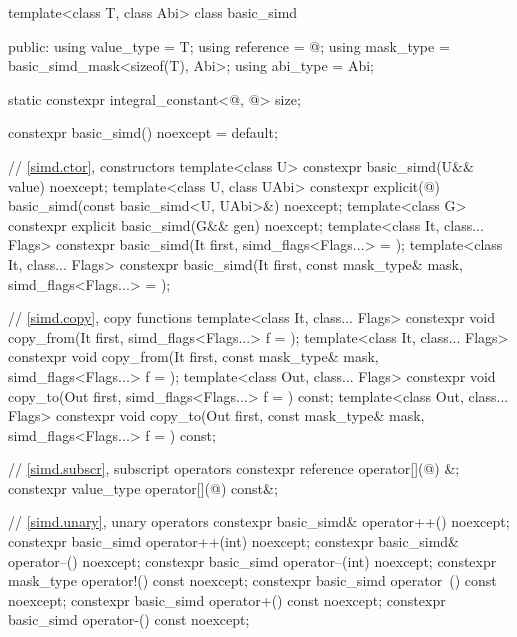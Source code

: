 \begin{codeblock}
template<class T, class Abi> class basic_simd {
public:
  using value_type = T;
  using reference = @\seebelow@;
  using mask_type = basic_simd_mask<sizeof(T), Abi>;
  using abi_type = Abi;

  static constexpr integral_constant<@\simdsizetype@, @\seebelow@> size;

  constexpr basic_simd() noexcept = default;

  // \ref{simd.ctor},  constructors
  template<class U> constexpr basic_simd(U&& value) noexcept;
  template<class U, class UAbi>
    constexpr explicit(@\seebelow@) basic_simd(const basic_simd<U, UAbi>&) noexcept;
  template<class G> constexpr explicit basic_simd(G&& gen) noexcept;
  template<class It, class... Flags>
    constexpr basic_simd(It first, simd_flags<Flags...> = {});
  template<class It, class... Flags>
    constexpr basic_simd(It first, const mask_type& mask, simd_flags<Flags...> = {});

  // \ref{simd.copy},  copy functions
  template<class It, class... Flags>
    constexpr void copy_from(It first, simd_flags<Flags...> f = {});
  template<class It, class... Flags>
    constexpr void copy_from(It first, const mask_type& mask, simd_flags<Flags...> f = {});
  template<class Out, class... Flags>
    constexpr void copy_to(Out first, simd_flags<Flags...> f = {}) const;
  template<class Out, class... Flags>
    constexpr void copy_to(Out first, const mask_type& mask, simd_flags<Flags...> f = {}) const;

  // \ref{simd.subscr},  subscript operators
  constexpr reference operator[](@\simdsizetype@) &;
  constexpr value_type operator[](@\simdsizetype@) const&;

  // \ref{simd.unary},  unary operators
  constexpr basic_simd& operator++() noexcept;
  constexpr basic_simd operator++(int) noexcept;
  constexpr basic_simd& operator--() noexcept;
  constexpr basic_simd operator--(int) noexcept;
  constexpr mask_type operator!() const noexcept;
  constexpr basic_simd operator~() const noexcept;
  constexpr basic_simd operator+() const noexcept;
  constexpr basic_simd operator-() const noexcept;

}
\end{codeblock}
